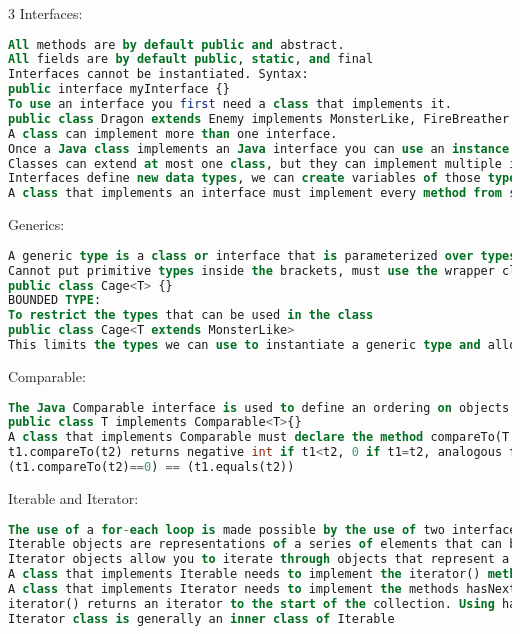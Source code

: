 \documentclass[10pt,landscape]{article}
\begin{document}
\begin{multicols}{3}
Interfaces: 
\begin{lstlisting}[language=SQL]
All methods are by default public and abstract. 
All fields are by default public, static, and final
Interfaces cannot be instantiated. Syntax: 
public interface myInterface {}
To use an interface you first need a class that implements it.
public class Dragon extends Enemy implements MonsterLike, FireBreather {}
A class can implement more than one interface.
Once a Java class implements an Java interface you can use an instance of that class as an instance of that interface
Classes can extend at most one class, but they can implement multiple interfaces.
Interfaces define new data types, we can create variables of those type and assign to them any value referencing to instances of classes that implement the specified interface.
A class that implements an interface must implement every method from such interface.
\end{lstlisting}
Generics:
\begin{lstlisting}[language=SQL]
A generic type is a class or interface that is parameterized over types. We use angle brackets (<>) to specify the type parameter. 
Cannot put primitive types inside the brackets, must use the wrapper classes. 
public class Cage<T> {}
BOUNDED TYPE: 
To restrict the types that can be used in the class
public class Cage<T extends MonsterLike>
This limits the types we can use to instantiate a generic type and allows us to use methods defined in the bounds.
\end{lstlisting}
Comparable:
\begin{lstlisting}[language=SQL]
The Java Comparable interface is used to define an ordering on objects of user-defined class.
public class T implements Comparable<T>{}
A class that implements Comparable must declare the method compareTo(T obj). 
t1.compareTo(t2) returns negative int if t1<t2, 0 if t1=t2, analogous for t1>t2. 
(t1.compareTo(t2)==0) == (t1.equals(t2))
\end{lstlisting}
Iterable and Iterator: 
\begin{lstlisting}[language=SQL]
The use of a for-each loop is made possible by the use of two interfaces: Iterator and Iterable.
Iterable objects are representations of a series of elements that can be iterated over.
Iterator objects allow you to iterate through objects that represent a collection (a series of elements).
A class that implements Iterable needs to implement the iterator() method. The iterator() method returns an object of type Iterator that can iterate through the elements of this instance.
A class that implements Iterator needs to implement the methods hasNext() and next().
iterator() returns an iterator to the start of the collection. Using hasNext() and next() you can move forward in the collection.
Iterator class is generally an inner class of Iterable


\end{lstlisting}
\end{multicols}
\end{document}
